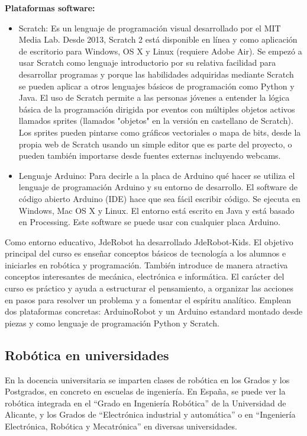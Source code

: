 \textbf{Plataformas software:} 
\begin{itemize}
	\item Scratch: Es un lenguaje de programación visual desarrollado por el MIT Media Lab. Desde 2013, Scratch 2 está disponible en línea y como aplicación de escritorio para Windows, OS X y Linux (requiere Adobe Air). Se empezó a usar Scratch como lenguaje introductorio por su relativa facilidad para desarrollar programas y  porque las habilidades adquiridas mediante Scratch se pueden aplicar a otros lenguajes básicos de programación como Python y Java. El uso de Scratch permite a las personas jóvenes a entender la lógica básica de la programación dirigida por eventos con múltiples objetos activos llamados sprites (llamados "objetos" en la versión en castellano de Scratch). Los sprites pueden pintarse como gráficos vectoriales o mapa de bits, desde la propia web de Scratch usando un simple editor que es parte del proyecto, o pueden también importarse desde fuentes externas incluyendo webcams.
	\item Lenguaje Arduino: Para decirle a la placa de Arduino qué hacer se utiliza el lenguaje de programación Arduino y su entorno de desarrollo. El software de código abierto Arduino (IDE) hace que sea fácil escribir código. Se ejecuta en Windows, Mac OS X y Linux. El entorno está escrito en Java y está basado en Processing. 
Este software se puede usar con cualquier placa Arduino.
\end{itemize}

Como entorno educativo, JdeRobot ha desarrollado JdeRobot-Kids. El objetivo principal del curso es enseñar conceptos básicos de tecnología a los alumnos e iniciarles en robótica y programación. También introduce de manera atractiva conceptos interesantes de mecánica, electrónica e informática. El carácter del curso es práctico y  ayuda a estructurar el pensamiento, a organizar las acciones en pasos para resolver un problema y a fomentar el espíritu analítico. Emplean dos plataformas concretas: ArduinoRobot y un Arduino estandard montado desde piezas y como lenguaje de programación Python y Scratch. 


\subsection{Robótica en universidades}

En la docencia universitaria se imparten clases de robótica en los Grados y los Postgrados, en concreto en escuelas de ingeniería. En España, se puede ver la robótica integrada en el ``Grado en Ingeniería Robótica'' de la Universidad de Alicante, y los Grados de ``Electrónica industrial y automática'' o en ``Ingeniería Electrónica, Robótica y Mecatrónica'' en diversas universidades. \\

